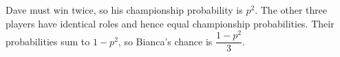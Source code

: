 Dave must win twice, so his championship probability is $p^2$. The other three players have identical roles and hence equal championship probabilities. Their probabilities sum to $1-p^2$, so Bianca's chance is $\boxed{\dfrac{1-p^2}{3}}$.
